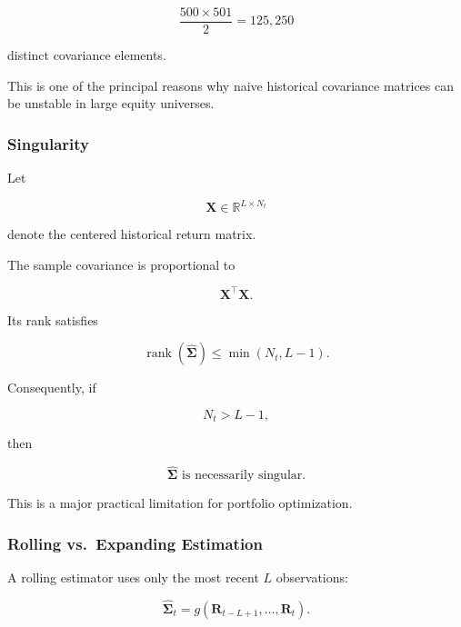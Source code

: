\documentclass[11pt,a4paper]{article}
\begin{document}
\begin{equation}
\frac{500\times501}{2}
=
125{,}250
\end{equation}

distinct covariance elements.

This is one of the principal reasons why naive historical covariance matrices
can be unstable in large equity universes.


\subsubsection{Singularity}

Let

\begin{equation}
\mathbf{X}
\in
\mathbb{R}^{L\times N_t}
\end{equation}

denote the centered historical return matrix.

The sample covariance is proportional to

\begin{equation}
\mathbf{X}^\top\mathbf{X}.
\end{equation}

Its rank satisfies

\begin{equation}
\operatorname{rank}
\left(
\widehat{\boldsymbol{\Sigma}}
\right)
\leq
\min
\left(
N_t,L-1
\right).
\end{equation}

Consequently, if

\begin{equation}
N_t>L-1,
\end{equation}

then

\begin{equation}
\boxed{
\widehat{\boldsymbol{\Sigma}}
\text{ is necessarily singular}.
}
\end{equation}

This is a major practical limitation for portfolio optimization.


\subsubsection{Rolling vs.\ Expanding Estimation}

A rolling estimator uses only the most recent $L$ observations:

\begin{equation}
\widehat{\boldsymbol{\Sigma}}_t
=
g
\left(
\mathbf{R}_{t-L+1},
\ldots,
\mathbf{R}_{t}
\right).
\end{equation}
\end{document}

